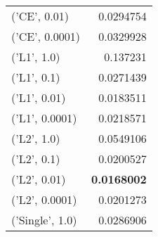 \begin{tabular}{lr}
 ('CE', 0.01)    &   0.0294754 \\
 ('CE', 0.0001)  &   0.0329928 \\
 ('L1', 1.0)     &   0.137231  \\
 ('L1', 0.1)     &   0.0271439 \\
 ('L1', 0.01)    &   0.0183511 \\
 ('L1', 0.0001)  &   0.0218571 \\
 ('L2', 1.0)     &   0.0549106 \\
 ('L2', 0.1)     &   0.0200527 \\
 ('L2', 0.01)    &   {\bf 0.0168002} \\
 ('L2', 0.0001)  &   0.0201273 \\
 ('Single', 1.0) &   0.0286906 \\
\hline
\end{tabular}